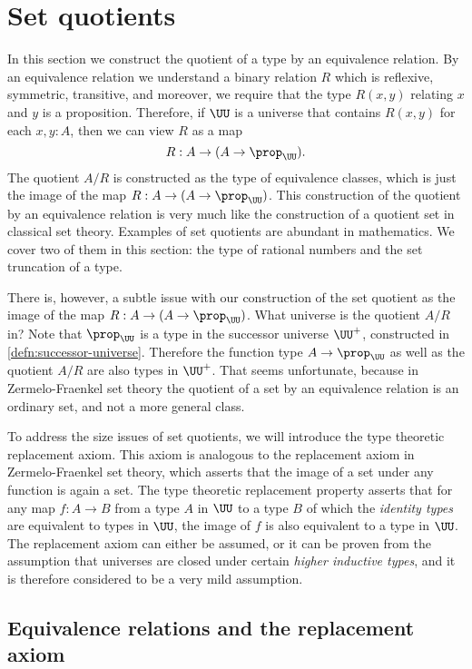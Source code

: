 \section{Set quotients}\label{sec:set-quotients}

In this section we construct the quotient of a type by an equivalence relation. By an equivalence relation we understand a binary relation $R$ which is reflexive, symmetric, transitive, and moreover, we require that the type $R(x,y)$ relating $x$ and $y$ is a proposition. Therefore, if $\UU$ is a universe that contains $R(x,y)$ for each $x,y:A$, then we can view $R$ as a map
\begin{equation*}
  R:A\to(A\to\prop_\UU).
\end{equation*}
The quotient $A/R$ is constructed as the type of equivalence classes, which is just the image of the map $R:A\to (A\to\prop_\UU)$. This construction of the quotient by an equivalence relation is very much like the construction of a quotient set in classical set theory. Examples of set quotients are abundant in mathematics. We cover two of them in this section: the type of rational numbers and the set truncation of a type.

There is, however, a subtle issue with our construction of the set quotient as the image of the map $R:A\to(A\to\prop_\UU)$. What universe is the quotient $A/R$ in? Note that $\prop_\UU$ is a type in the successor universe $\UU^+$, constructed in \cref{defn:successor-universe}. Therefore the function type $A\to \prop_\UU$ as well as the quotient $A/R$ are also types in $\UU^+$. That seems unfortunate, because in Zermelo-Fraenkel set theory the quotient of a set by an equivalence relation is an ordinary set, and not a more general class.

To address the size issues of set quotients, we will introduce the type theoretic replacement axiom. This axiom is analogous to the replacement axiom in Zermelo-Fraenkel set theory, which asserts that the image of a set under any function is again a set. The type theoretic replacement property asserts that for any map $f:A\to B$ from a type $A$ in $\UU$ to a type $B$ of which the \emph{identity types} are equivalent to types in $\UU$, the image of $f$ is also equivalent to a type in $\UU$. The replacement axiom can either be assumed, or it can be proven from the assumption that universes are closed under certain \emph{higher inductive types}, and it is therefore considered to be a very mild assumption.

\subsection{Equivalence relations and the replacement axiom}

